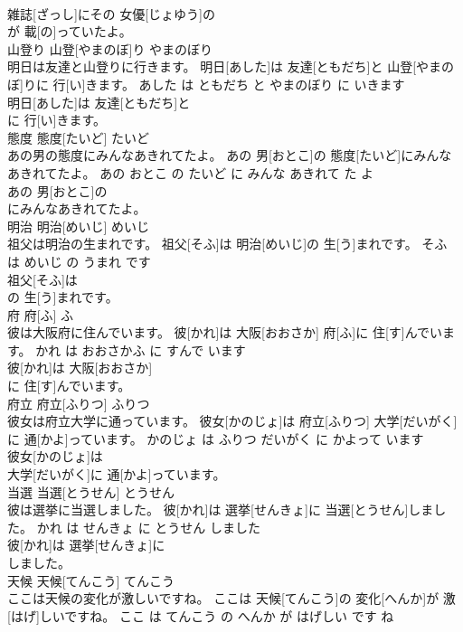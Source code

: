 \documentclass[8pt]{extreport}
\begin{document}
\begin{CJK}{UTF8}{min}
\\	雑誌[ざっし]にその 女優[じょゆう]の
\\	が 載[の]っていたよ。			
\\	山登り	山登[やまのぼ]り	やまのぼり	
\\	明日は友達と山登りに行きます。	明日[あした]は 友達[ともだち]と 山登[やまのぼ]りに 行[い]きます。	あした は ともだち と やまのぼり に いきます	
\\	明日[あした]は 友達[ともだち]と
\\	に 行[い]きます。			
\\	態度	態度[たいど]	たいど	
\\	あの男の態度にみんなあきれてたよ。	あの 男[おとこ]の 態度[たいど]にみんなあきれてたよ。	あの おとこ の たいど に みんな あきれて た よ	
\\	あの 男[おとこ]の
\\	にみんなあきれてたよ。			
\\	明治	明治[めいじ]	めいじ	
\\	祖父は明治の生まれです。	祖父[そふ]は 明治[めいじ]の 生[う]まれです。	そふ は めいじ の うまれ です	
\\	祖父[そふ]は
\\	の 生[う]まれです。			
\\	府	府[ふ]	ふ	
\\	彼は大阪府に住んでいます。	彼[かれ]は 大阪[おおさか] 府[ふ]に 住[す]んでいます。	かれ は おおさかふ に すんで います	
\\	彼[かれ]は 大阪[おおさか]
\\	に 住[す]んでいます。			
\\	府立	府立[ふりつ]	ふりつ	
\\	彼女は府立大学に通っています。	彼女[かのじょ]は 府立[ふりつ] 大学[だいがく]に 通[かよ]っています。	かのじょ は ふりつ だいがく に かよって います	
\\	彼女[かのじょ]は
\\	大学[だいがく]に 通[かよ]っています。			
\\	当選	当選[とうせん]	とうせん	
\\	彼は選挙に当選しました。	彼[かれ]は 選挙[せんきょ]に 当選[とうせん]しました。	かれ は せんきょ に とうせん しました	
\\	彼[かれ]は 選挙[せんきょ]に
\\	しました。			
\\	天候	天候[てんこう]	てんこう	
\\	ここは天候の変化が激しいですね。	ここは 天候[てんこう]の 変化[へんか]が 激[はげ]しいですね。	ここ は てんこう の へんか が はげしい です ね	

\end{CJK}
\end{document}
